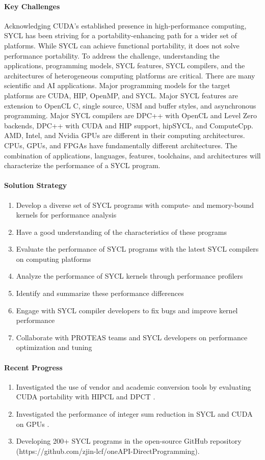\paragraph{Key Challenges}
Acknowledging CUDA's established presence in high-performance computing, SYCL has been striving for a portability-enhancing path for a wider set of platforms. While SYCL can achieve functional portability, it does not solve performance portability. To address the challenge, understanding the applications, programming models, SYCL features, SYCL compilers, and the architectures of heterogeneous computing platforms are critical. There are many scientific and AI applications. Major programming models for the target platforms are CUDA, HIP, OpenMP, and SYCL. Major SYCL features are extension to OpenCL C, single source, USM and buffer styles, and asynchronous programming. Major SYCL compilers are DPC++ with OpenCL and Level Zero backends, DPC++ with CUDA and HIP support, hipSYCL, and ComputeCpp. AMD, Intel, and Nvidia GPUs are different in their computing architectures. CPUs, GPUs, and FPGAs have fundamentally different architectures. The combination of applications, languages, features, toolchains, and architectures will characterize the performance of a SYCL program.


\paragraph{Solution Strategy}
\begin{enumerate}
\item Develop a diverse set of SYCL programs with compute- and memory-bound kernels for performance analysis  
\item Have a good understanding of the characteristics of these programs 
\item Evaluate the performance of SYCL programs with the latest SYCL compilers on computing platforms
\item Analyze the performance of SYCL kernels through performance profilers
\item Identify and summarize these performance differences
\item Engage with SYCL compiler developers to fix bugs and improve kernel performance
\item Collaborate with PROTEAS teams and SYCL developers on performance optimization and tuning
\end{enumerate}


\paragraph{Recent Progress}
\begin{enumerate}
\item Investigated the use of vendor and academic conversion tools by evaluating CUDA portability with HIPCL and DPCT \cite{dpct}.
\item Investigated the performance of integer sum reduction in SYCL and CUDA on GPUs \cite{reduction}.
\item Developing 200+ SYCL programs in the open-source GitHub repository (https://github.com/zjin-lcf/oneAPI-DirectProgramming).
\end{enumerate}


